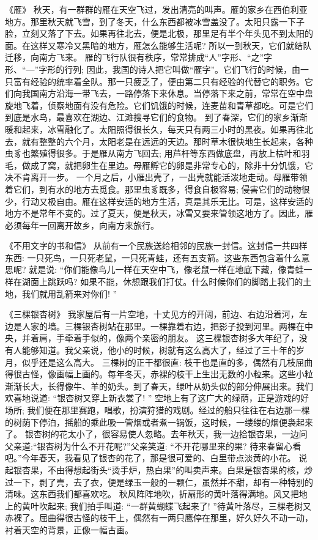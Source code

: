 《雁》
秋天，有一群群的雁在天空飞过，发出清亮的叫声。雁的家乡在西伯利亚地方。那里秋天就飞雪，到了冬天，什么东西都被冰雪盖没了。太阳只露一下子脸，立刻又落了下去。如果再往北去，便是北极，那里足有半个年头见不到太阳的面。在这样又寒冷又黑暗的地方，雁怎么能够生活呢? 所以一到秋天，它们就结队迁移，向南方飞来。
雁的飞行队很有秩序，常常排成“人”字形、“之”字形、“—”字形的行列; 因此，我国的诗人把它叫做“雁字”。它们飞行的时候，由一只富有经验的统率着全队。那一只疲乏了，便由第二只有经验的代替它的职务。它们向我国南方沿海一带飞去，一路停落下来休息。当停落下来之前，常常在空中盘旋地飞着，侦察地面有没有危险。它们饥饿的时候，连麦苗和青草都吃。可是它们到底是水鸟，最喜欢在湖边、江滩搜寻它们的食物。
到了春深，它们的家乡渐渐暖和起来，冰雪融化了。太阳照得很长久，每天只有两三小时的黑夜。如果再往北去，就有整整的六个月，太阳老是在远远的天边。那时草木很快地生长起来，各种虫豸也繁殖得很多。于是雁从南方飞回去; 用芦杆等东西做底盘，再放上枯叶和羽毛，做成了窝，就把卵生在里边。母雁孵它的卵是非常专心的，除非十分饥饿，它决不肯离开一步。
一个月之后，小雁出壳了，一出壳就能活泼地走动。母雁带领着它们，到有水的地方去觅食。那里虫豸既多，得食自极容易; 侵害它们的动物很少，行动又极自由。雁在这样安适的地方生活，真是其乐无比。可是，这样安适的地方不是常年不变的。过了夏天，便是秋天，冰雪又要来管领这地方了。因此，雁必须每年一回离开故乡，向南方来旅行。
 
《不用文字的书和信》
从前有一个民族送给相邻的民族一封信。这封信一共四样东西: 一只死鸟，一只死老鼠，一只死青蛙，还有五支箭。这些东西包含着什么意思呢? 就是说: “你们能像鸟儿一样在天空中飞，像老鼠一样在地底下藏，像青蛙一样在湖面上跳跃吗? 如果不能，休想跟我们打仗。什么时候你们的脚踏上我们的土地，我们就用乱箭来对你们! ”
 
《三棵银杏树》
我家屋后有一片空地，十丈见方的开阔，前边、右边沿着河，左边是人家的墙。三棵银杏树站在那里。一棵靠着右边，把影子投到河里。两棵在中央，并着肩，手牵着手似的，像两个亲密的朋友。
这三棵银杏树多大年纪了，没有人能够知道。我父亲说，他小的时候，树就有这么高大了，经过了三十年的岁月，似乎还是这么高大。
三棵树的正干都很直: 枝干也是直的多，偶然有几枝屈曲得很古怪，像画幅上画的。每年冬天，赤裸的枝干上生出无数的小粒来。这些小粒渐渐长大，长得像牛、羊的奶头。到了春天，绿叶从奶头似的部分伸展出来。我们欢喜地说道: “银杏树又穿上新衣裳了! ”
空地上有了这广大的绿荫，正是游戏的好场所; 我们便在那里赛跑，唱歌，扮演狩猎的戏剧。经过的船只往往在右边那一棵的树荫下停泊，摇船的乘此吸一管烟或者煮一锅饭，这时候，一缕缕的烟便袅起来了。
银杏树的花太小了，很容易使人忽略。去年秋天，我一边拾银杏果，一边问父亲道:“银杏树为什么不开花呢?”父亲笑道: “不开花哪里来的果? 待来春留心看吧。”今年春天，我看见了银杏的花了，那是很可爱的、白里带点淡黄的小花。
说起银杏果，不由得想起街头“烫手炉，热白果”的叫卖声来。白果是银杏果的核，炒过一下，剥了壳，去了衣，便是绿玉一般的一颗仁，虽然并不甜，却有一种特别的清味。这东西我们都喜欢吃。
秋风阵阵地吹，折扇形的黄叶落得满地。风又把地上的黄叶吹起来; 我们拍手叫道: “一群黄蝴蝶飞起来了! ”待黄叶落尽，三棵老树又赤裸了。屈曲得很古怪的枝干上，偶然有一两只鹰停在那里，好久好久不动一动，衬着天空的背景，正像一幅古画。
 

